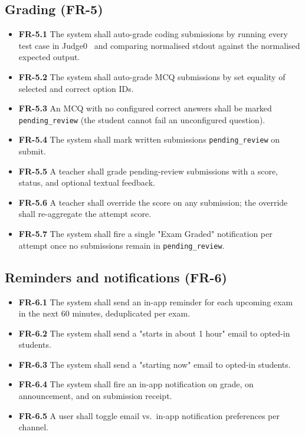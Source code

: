 \subsection{Grading (FR-5)}

\begin{itemize}
  \item \textbf{FR-5.1} The system shall auto-grade coding submissions by running every test case in Judge0~\cite{judge0} and comparing normalised stdout against the normalised expected output.
  \item \textbf{FR-5.2} The system shall auto-grade MCQ submissions by set equality of selected and correct option IDs.
  \item \textbf{FR-5.3} An MCQ with no configured correct answers shall be marked \texttt{pending\_review} (the student cannot fail an unconfigured question).
  \item \textbf{FR-5.4} The system shall mark written submissions \texttt{pending\_review} on submit.
  \item \textbf{FR-5.5} A teacher shall grade pending-review submissions with a score, status, and optional textual feedback.
  \item \textbf{FR-5.6} A teacher shall override the score on any submission; the override shall re-aggregate the attempt score.
  \item \textbf{FR-5.7} The system shall fire a single "Exam Graded" notification per attempt once no submissions remain in \texttt{pending\_review}.
\end{itemize}

\subsection{Reminders and notifications (FR-6)}

\begin{itemize}
  \item \textbf{FR-6.1} The system shall send an in-app reminder for each upcoming exam in the next 60 minutes, deduplicated per exam.
  \item \textbf{FR-6.2} The system shall send a "starts in about 1 hour" email to opted-in students.
  \item \textbf{FR-6.3} The system shall send a "starting now" email to opted-in students.
  \item \textbf{FR-6.4} The system shall fire an in-app notification on grade, on announcement, and on submission receipt.
  \item \textbf{FR-6.5} A user shall toggle email vs.\ in-app notification preferences per channel.
\end{itemize}

